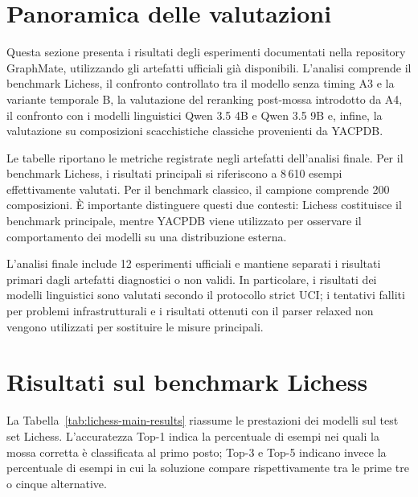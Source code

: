 
\label{chap:results}

\section{Panoramica delle valutazioni}

Questa sezione presenta i risultati degli esperimenti documentati nella repository GraphMate, utilizzando gli artefatti ufficiali già disponibili. L'analisi comprende il benchmark Lichess, il confronto controllato tra il modello senza timing A3 e la variante temporale B, la valutazione del reranking post-mossa introdotto da A4, il confronto con i modelli linguistici Qwen 3.5 4B e Qwen 3.5 9B e, infine, la valutazione su composizioni scacchistiche classiche provenienti da YACPDB.

Le tabelle riportano le metriche registrate negli artefatti dell'analisi finale. Per il benchmark Lichess, i risultati principali si riferiscono a 8\,610 esempi effettivamente valutati. Per il benchmark classico, il campione comprende 200 composizioni. È importante distinguere questi due contesti: Lichess costituisce il benchmark principale, mentre YACPDB viene utilizzato per osservare il comportamento dei modelli su una distribuzione esterna.

L'analisi finale include 12 esperimenti ufficiali e mantiene separati i risultati primari dagli artefatti diagnostici o non validi. In particolare, i risultati dei modelli linguistici sono valutati secondo il protocollo strict UCI; i tentativi falliti per problemi infrastrutturali e i risultati ottenuti con il parser relaxed non vengono utilizzati per sostituire le misure principali.

\section{Risultati sul benchmark Lichess}

La Tabella~\ref{tab:lichess-main-results} riassume le prestazioni dei modelli sul test set Lichess. L'accuratezza Top-1 indica la percentuale di esempi nei quali la mossa corretta è classificata al primo posto; Top-3 e Top-5 indicano invece la percentuale di esempi in cui la soluzione compare rispettivamente tra le prime tre o cinque alternative.

